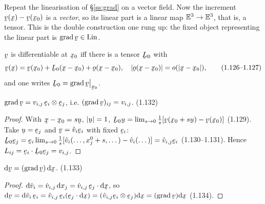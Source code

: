 Repeat the linearisation of \S\ref{ss:grad} on a vector field. Now the
increment $\bv(\bx)-\bv(\bx_0)$ is a \emph{vector}, so its linear part is a
linear map $\mathbb{E}^{3}\to\mathbb{E}^{3}$, that is, a tensor. This is the double construction
one rung up: the fixed object representing the linear part is
$\grad\bv\in\Lin$.

\begin{definition}\label{def:diffv}
$\bv$ is differentiable at $\bx_0$ iff there is a tensor $\bL_0$ with
\begin{equation}
\bv(\bx)=\bv(\bx_0)+\bL_0(\bx-\bx_0)+\bo(\bx-\bx_0),\quad
|\bo(\bx-\bx_0)|=o(|\bx-\bx_0|), \tag{1.126--1.127}\label{eq:1.126}
\end{equation}
and one writes $\bL_0=\grad\bv\rest{\bx_0}$.
\end{definition}

\begin{theorem}\label{thm:gradvcart}
$\grad\bv=v_{i,j}\,\be_i\otimes\be_j$, i.e. $(\grad\bv)_{ij}=v_{i,j}$.
\hfill\textup{(1.132)}
\end{theorem}

\begin{proof}
With $\bx-\bx_0=s\bu$, $|\bu|=1$,
$\bL_0\bu=\lim_{s\to0}\tfrac1s[\bv(\bx_0+s\bu)-\bv(\bx_0)]$ (1.129). Take
$\bu=\be_j$ and $\bv=\hat v_i\be_i$ with fixed $\be_i$:
$\bL_0\be_j=\be_i\lim_{s\to0}\tfrac1s[\hat v_i(\dots,x_j^0+s,\dots)
-\hat v_i(\dots)]=\hat v_{i,j}\be_i$ (1.130--1.131). Hence
$L_{ij}=\ip{\be_i}{\bL_0\be_j}=v_{i,j}$.
\end{proof}

\begin{corollary}\label{cor:dv}
$\dl\bv=(\grad\bv)\,\dl\bx$. \hfill\textup{(1.133)}
\end{corollary}

\begin{proof}
$\dl\hat v_i=\hat v_{i,j}\,\dl x_j=\hat v_{i,j}\,\be_j\cdot\dl\bx$, so
$\dl\bv=\dl\hat v_i\,\be_i=\hat v_{i,j}\,\be_i(\be_j\cdot\dl\bx)
=(\hat v_{i,j}\be_i\otimes\be_j)\dl\bx=(\grad\bv)\dl\bx$ (1.134).
\end{proof}

